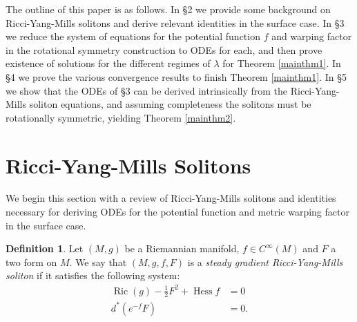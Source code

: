 \documentclass[12pt, a4paper, reqno, oneside]{amsart}
\DeclareMathOperator{\Hess}{Hess}
\DeclareMathOperator{\Ric}{Ric}
\numberwithin{equation}{section}
\theoremstyle{plain}
\theoremstyle{definition}
\newtheorem{definition}[theorem]{Definition}
\theoremstyle{plain}
\begin{document}
The outline of this paper is as follows. In \S 2 we provide some background on Ricci-Yang-Mills solitons and derive relevant identities in the surface case. In \S 3 we reduce the system of equations for the potential function {}$f$ and warping factor in the rotational symmetry construction to ODEs for each, and then prove existence of solutions for the different regimes of $\lambda$ for Theorem \ref{mainthm1}. In \S 4 we prove the various convergence results to finish Theorem \ref{mainthm1}. In \S 5 we show that the ODEs of \S 3 can be derived intrinsically from the Ricci-Yang-Mills soliton equations, and assuming completeness the solitons must be rotationally symmetric, yielding Theorem \ref{mainthm2}.


\section{Ricci-Yang-Mills Solitons}
We begin this section with a review of Ricci-Yang-Mills solitons and identities necessary for deriving ODEs for the potential function and metric warping factor in the surface case.
\begin{definition}\label{sgRYMSoliton_def}
  Let $(M,g)$ be a Riemannian manifold, $f\in C^{\infty}(M)$ and $F$ a two form on $M$. We say that $(M,g,f,F)$ is a \emph{steady gradient Ricci-Yang-Mills soliton} if it satisfies the following system:
  \begin{align*}
      \Ric(g)-\frac{1}{2}F^2+\Hess f &= 0\\
      d^{*}(e^{-f}F) &= 0.
  \end{align*}
\end{definition}
\end{document}
